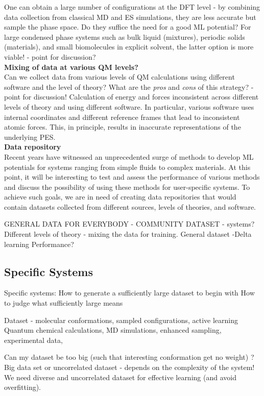 \documentclass[9pt,bestpractices]{livecoms}
\begin{document}
One can obtain a large number of configurations at the DFT level - by combining data collection from classical MD and ES simulations, they are less accurate but sample the phase space. Do they suffice the need for a good ML potential? For large condensed phase systems such as bulk liquid (mixtures), periodic solids (materials), and small biomolecules in explicit solvent, the latter option is more viable! - point for discussion?\\


{\bf Mixing of data at various QM levels?}\\
Can we collect data from various levels of QM calculations using different software and the level of theory? What are the {\em pros} and {\em cons} of this strategy? - point for discussion! Calculation of energy and forces inconsistent across different levels of theory and using different software. In particular, various software uses internal coordinates and different reference frames that lead to inconsistent atomic forces. This, in principle, results in inaccurate representations of the underlying PES.\\


{\bf Data repository}\\
Recent years have witnessed an unprecedented surge of methods to develop ML potentials for systems ranging from simple fluids to complex materials. At this point, it will be interesting to test and assess the performance of various methods and discuss the possibility of using these methods for user-specific systems. To achieve such goals, we are in need of creating data repositories that would contain datasets collected from different sources, levels of theories, and software. 

GENERAL DATA FOR EVERYBODY - COMMUNITY DATASET - systems? Different levels of theory - mixing the data for training. General dataset -Delta learning Performance? 

\subsection{Specific Systems}
Specific systems: 
How to generate a sufficiently large dataset to begin with
How to judge what sufficiently large means

Dataset - molecular conformations, sampled configurations, active learning
Quantum chemical calculations, MD simulations, enhanced sampling, experimental data, 


Can my dataset be too big (such that interesting conformation get no weight) ?
Big data set or uncorrelated dataset - depends on the complexity of the system! We need diverse and uncorrelated dataset for effective learning (and avoid overfitting). 
\end{document}
